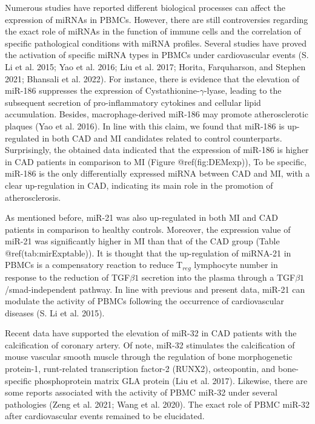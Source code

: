 \documentclass[smallextended]{svjour3}       %
\begin{document}
Numerous studies have reported different biological processes can affect
the expression of miRNAs in PBMCs. However, there are still
controversies regarding the exact role of miRNAs in the function of
immune cells and the correlation of specific pathological conditions
with miRNA profiles. Several studies have proved the activation of
specific miRNA types in PBMCs under cardiovascular events (S. Li et al.
2015; Yao et al. 2016; Liu et al. 2017; Horita, Farquharson, and Stephen
2021; Bhansali et al. 2022). For instance, there is evidence that the
elevation of miR-186 suppresses the expression of
Cystathionine-\(\gamma\)-lyase, leading to the subsequent secretion of
pro-inflammatory cytokines and cellular lipid accumulation. Besides,
macrophage-derived miR-186 may promote atherosclerotic plaques (Yao et
al. 2016). In line with this claim, we found that miR-186 is
up-regulated in both CAD and MI candidates related to control
counterparts. Surprisingly, the obtained data indicated that the
expression of miR-186 is higher in CAD patients in comparison to MI
(Figure @ref(fig:DEMexp)), To be specific, miR-186 is the only
differentially expressed miRNA between CAD and MI, with a clear
up-regulation in CAD, indicating its main role in the promotion of
atherosclerosis.

As mentioned before, miR-21 was also up-regulated in both MI and CAD
patients in comparison to healthy controls. Moreover, the expression
value of miR-21 was significantly higher in MI than that of the CAD
group (Table @ref(tab:mirExptable)). It is thought that the
up-regulation of miRNA-21 in PBMCs is a compensatory reaction to reduce
T\(_{reg}\) lymphocyte number in response to the reduction of
TGF\(\beta1\) secretion into the plasma through a
TGF\(\beta1\)/smad-independent pathway. In line with previous and
present data, miR-21 can modulate the activity of PBMCs following the
occurrence of cardiovascular diseases (S. Li et al. 2015).

Recent data have supported the elevation of miR-32 in CAD patients with
the calcification of coronary artery. Of note, miR-32 stimulates the
calcification of mouse vascular smooth muscle through the regulation of
bone morphogenetic protein-1, runt-related transcription factor-2
(RUNX2), osteopontin, and bone-specific phosphoprotein matrix GLA
protein (Liu et al. 2017). Likewise, there are some reports associated
with the activity of PBMC miR-32 under several pathologies (Zeng et al.
2021; Wang et al. 2020). The exact role of PBMC miR-32 after
cardiovascular events remained to be elucidated.
\end{document}
